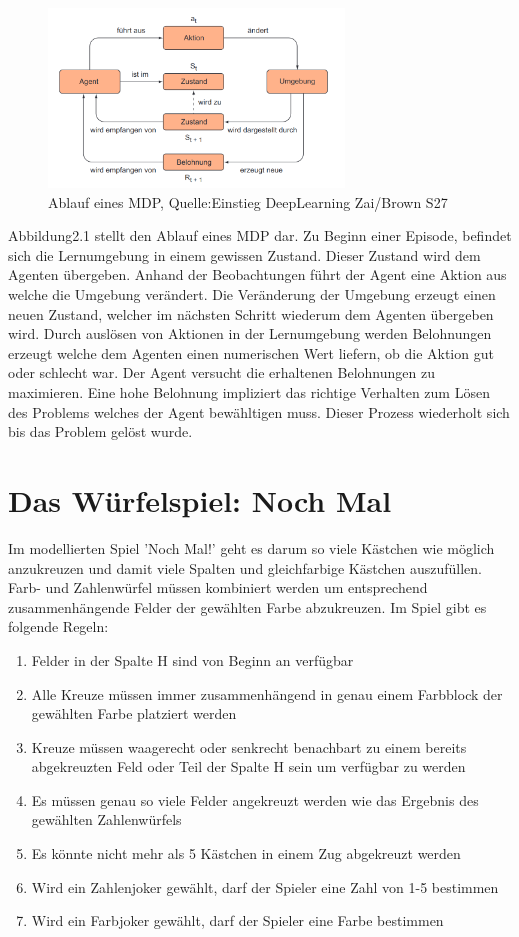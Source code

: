 \begin{figure}[!htb]
	\centering
	\includegraphics[width=0.7\textwidth]{Bilder/Markov.png}
	\caption{Ablauf eines MDP, Quelle:Einstieg DeepLearning Zai/Brown S27}
\end{figure}
\newpage
Abbildung2.1 stellt den Ablauf eines MDP dar. Zu Beginn einer Episode, befindet sich die Lernumgebung in einem gewissen Zustand. Dieser Zustand wird dem Agenten übergeben. Anhand der Beobachtungen führt der Agent eine Aktion aus welche die Umgebung verändert. Die Veränderung der Umgebung erzeugt einen neuen Zustand, welcher im nächsten Schritt wiederum dem Agenten übergeben wird. Durch auslösen von Aktionen in der Lernumgebung werden Belohnungen erzeugt welche dem Agenten einen numerischen Wert liefern, ob die Aktion gut oder schlecht war. Der Agent versucht die erhaltenen Belohnungen zu maximieren.
Eine hohe Belohnung impliziert das richtige Verhalten zum Lösen des Problems welches der Agent bewähltigen muss.
Dieser Prozess wiederholt sich bis das Problem gelöst wurde. 
\newpage
\section{Das Würfelspiel: Noch Mal}
Im modellierten Spiel 'Noch Mal!' geht es darum so viele Kästchen wie möglich anzukreuzen und damit viele Spalten und gleichfarbige Kästchen auszufüllen.
Farb- und Zahlenwürfel müssen kombiniert werden um entsprechend zusammenhängende Felder der gewählten Farbe abzukreuzen. 
Im Spiel gibt es folgende Regeln:
\begin{enumerate}
    \item Felder in der Spalte H sind von Beginn an verfügbar
    \item Alle Kreuze müssen immer zusammenhängend in genau einem Farbblock der gewählten Farbe platziert werden
    \item Kreuze müssen waagerecht oder senkrecht benachbart zu einem bereits abgekreuzten Feld oder Teil der Spalte H sein um verfügbar zu werden
    \item Es müssen genau so viele Felder angekreuzt werden wie das Ergebnis des gewählten Zahlenwürfels
    \item Es könnte nicht mehr als 5 Kästchen in einem Zug abgekreuzt werden
    \item Wird ein Zahlenjoker gewählt, darf der Spieler eine Zahl von 1-5 bestimmen
    \item Wird ein Farbjoker gewählt, darf der Spieler eine Farbe bestimmen
\end{enumerate}


